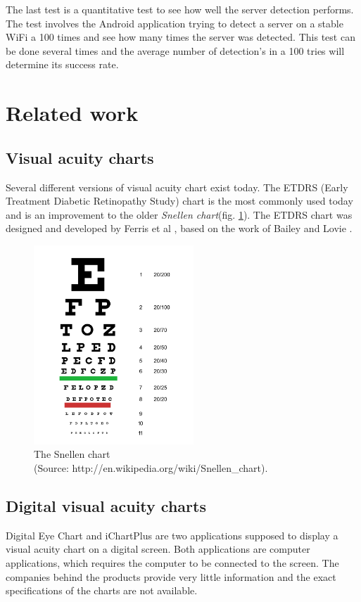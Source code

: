 \documentclass[12pt,a4paper,notitlepage]{report}
\begin{document}
The last test is a quantitative test to see how well the server detection performs. The test involves the Android application trying to detect a server on a stable WiFi a 100 times and see how many times the server was detected. This test can be done several times and the average number of detection's in a 100 tries will determine its success rate.

\section{Related work}

\subsection{Visual acuity charts}
Several different versions of visual acuity chart exist today. The ETDRS (Early Treatment Diabetic Retinopathy Study) chart is the most commonly used today and is an improvement to the older \textit{Snellen chart}(fig. \ref{fig:snellen_chart}). The ETDRS chart was designed and developed by Ferris et al \cite{Ferris}, based on the work of Bailey and Lovie \cite{Bailey}. 

\begin{figure}[ht!]
\centering
\includegraphics[width=60mm]{images/snellen_chart.png}
\caption{The Snellen chart \\ (Source: http://en.wikipedia.org/wiki/Snellen\_chart).} \label{fig:snellen_chart}
\end{figure} 

\subsection{Digital visual acuity charts}
Digital Eye Chart \cite{digitaleyechart} and iChartPlus \cite{ichartplus} are two applications supposed to display a visual acuity chart on a digital screen. Both applications are computer applications, which requires the computer to be connected to the screen. The companies behind the products provide very little information and the exact specifications of the charts are not available.
\end{document}
